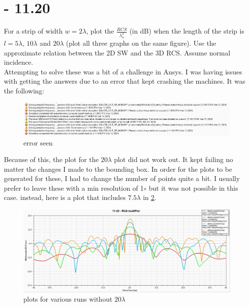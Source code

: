 \documentclass[12pt]{article}
\begin{document}
\section{- 11.20}
For a strip of width $w = 2\lambda$, plot the $\frac{RCS}{\lambda_o^2}$ (in dB) when the length of the strip is $l = 5\lambda$, $10\lambda$ and $20\lambda$ (plot all three graphs on the same figure). Use the approximate relation between the 2D SW and the 3D RCS. Assume normal incidence.\\
Attempting to solve these was a bit of a challenge in Ansys. I was having issues with getting the answers due to an error that kept crashing the machines. It was the following:
\begin{center}
\begin{figure}[h]
  \hspace{-2cm}
  \centering
    \includegraphics[width=19cm]{./images/errors.png}
    \caption{error seen}
    \label{fig:error_11-20}
  \end{figure}
\end{center}
Because of this, the plot for the $20\lambda$ plot did not work out. It kept failing no matter the changes I made to the bounding box. In order for the plots to be generated for these, I had to change the number of points quite a bit. I usually prefer to leave these with a min resolution of 1$\circ$ but it was not possible in this case. instead, here is a plot that includes $7.5\lambda$ in \ref{fig:endResults}.
\begin{center}
\begin{figure}[h]
  \hspace{-2cm}
  \centering
    \includegraphics[width=19cm]{./images/rcs_plots_multi.png}
    \caption{plots for various runs without $20\lambda$}
    \label{fig:endResults}
  \end{figure}
\end{center}



\newpage



\end{document}
